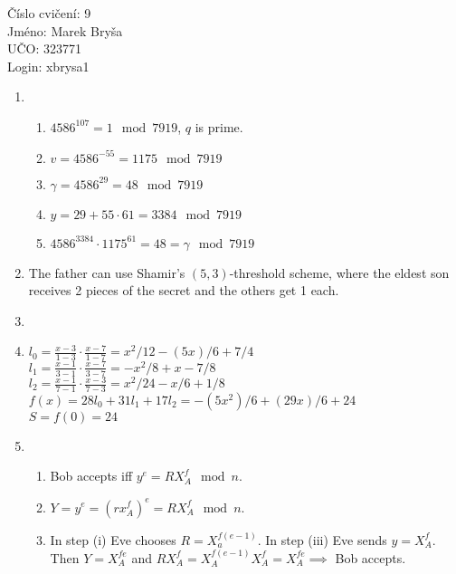 \documentclass[a4paper,10pt]{extarticle}
\begin{document}
\begin{flushleft}
Číslo cvičení: 9 \\ 
Jméno: Marek Bryša \\
UČO: 323771\\
Login: xbrysa1\\
\end{flushleft}
\begin{enumerate}
  \item
    \begin{enumerate}
      \item
        $4586^{107}=1 \mod 7919$, $q$ is prime.
      \item
        $v=4586^{-55}=1175 \mod 7919$
      \item
        $\gamma=4586^{29}=48 \mod 7919$
      \item
        $y=29+55\cdot61=3384 \mod 7919$
      \item
        $4586^{3384}\cdot1175^{61}=48=\gamma \mod 7919$
    \end{enumerate}
  \item
    The father can use Shamir's $(5,3)$-threshold scheme, where the eldest son receives 2 pieces of the secret and the others get 1 each.
  \item
  \item
    $l_0=\frac{x-3}{1-3}\cdot\frac{x-7}{1-7}=x^2/12-(5 x)/6+7/4$\\
    $l_1=\frac{x-1}{3-1}\cdot\frac{x-7}{3-7}=-x^2/8+x-7/8$\\
    $l_2=\frac{x-1}{7-1}\cdot\frac{x-3}{7-3}=x^2/24-x/6+1/8$\\
    $f(x)=28l_0+31l_1+17l_2=-(5 x^2)/6+(29 x)/6+24$\\
    $S=f(0)=24$
  \item
    \begin{enumerate}
      \item
        Bob accepts iff $y^e=RX_A^f \mod n$.
      \item
        $Y=y^e=(rx_A^f)^e=RX_A^f \mod n$.
      \item
        In step (i) Eve chooses $R=X_a^{f(e-1)}$. In step (iii) Eve sends $y=X_A^f$. Then $Y=X_A^{fe}$ and $RX_A^f=X_A^{f(e-1)}X_A^f=X_A^{fe}\implies$ Bob accepts.
        
    \end{enumerate}

\end{enumerate}
\end{document}
